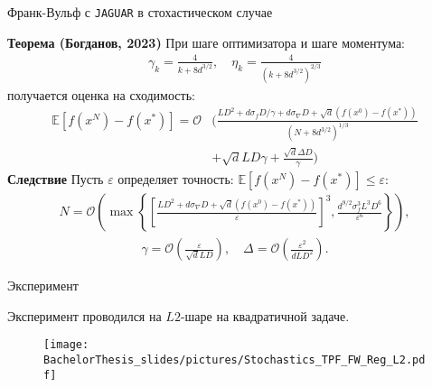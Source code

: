 \documentclass{beamer}
\begin{document}
\begin{frame}{Франк-Вульф с \texttt{JAGUAR} в стохастическом случае}

    \textbf{Теорема (Богданов, 2023)} При шаге оптимизатора и шаге моментума:
    \begin{align*}
        \gamma_k = \frac{4}{k + 8d^{3/2}}, \quad \eta_k = \frac{4}{(k + 8d^{3/2})^{2/3}}
    \end{align*}
    получается оценка на сходимость:
    \small{
        \begin{align*}
            \mathbb{E}\left[f(x^{N}) - f(x^*) \right] = \mathcal{O}
            &\Bigg(
            \frac{L D^2 + d \sigma_f D/ \gamma + d \sigma_{\nabla} D + \sqrt{d} (f(x^0) - f(x^*))}{(N + 8d^{3/2})^{1/3}} \\
            &+
            \sqrt{d} L D \gamma + \frac{\sqrt{d} \Delta D}{\gamma} \Bigg)
        \end{align*}
    }
    \textbf{Следствие} Пусть $\varepsilon$ определяет точность: $\mathbb{E} \left[ f(x^N) - f(x^*) \right] \leq \varepsilon$:
    \begin{align*}
        N = \mathcal{O} \left( \max\left\{ \left[ \frac{L D^2 + d\sigma_{\nabla} D + \sqrt{d} (f(x^0) - f(x^*))}{\varepsilon}\right]^3 , \frac{d^{9/2} \sigma_f^3 L^3D^6}{\varepsilon^6} \right\}\right),
    \end{align*}
    \begin{align*}
        \gamma = \mathcal{O} \left(\frac{\varepsilon}{\sqrt{d} L D} \right), \quad \Delta = \mathcal{O} \left( \frac{\varepsilon^2}{d L D^2}\right).
    \end{align*}
            
\end{frame}


\begin{frame}{Эксперимент}

    Эксперимент проводился на $L2$-шаре на квадратичной задаче.

    \begin{figure}
        \centering
        \texttt{[image: BachelorThesis\_slides/pictures/Stochastics\_TPF\_FW\_Reg\_L2.pdf]}
    \end{figure}

\end{frame}

\end{document}

